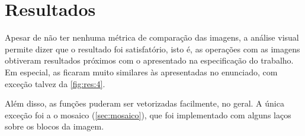 \documentclass[assignment = 0]{homework}
\begin{document}
    

    

    \section{Resultados}

    Apesar de não ter nenhuma métrica de comparação das imagens, a análise visual permite dizer que o resultado foi satisfatório, isto é, as operações com as imagens obtiveram resultados próximos com o apresentado na especificação do trabalho. Em especial, as  ficaram muito similares às apresentadas no enunciado, com exceção talvez da \cref{fig:res:4}.

    Além disso, as funções puderam ser vetorizadas facilmente, no geral. A única exceção foi a o mosaico (\cref{sec:mosaico}), que foi implementado com alguns laços sobre os blocos da imagem.
\end{document}
